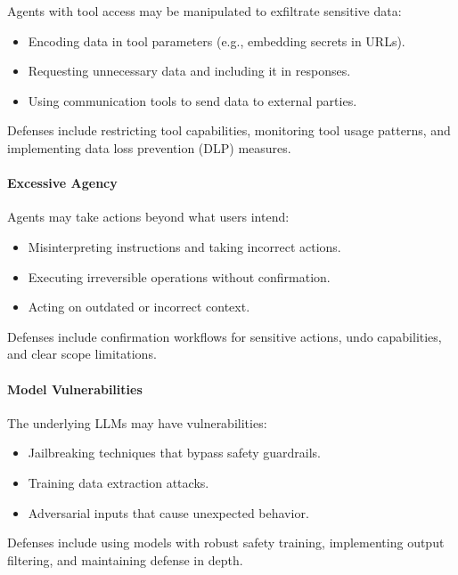 Agents with tool access may be manipulated to exfiltrate sensitive data:

\begin{itemize}
    \item Encoding data in tool parameters (e.g., embedding secrets in URLs).
    \item Requesting unnecessary data and including it in responses.
    \item Using communication tools to send data to external parties.
\end{itemize}

Defenses include restricting tool capabilities, monitoring tool usage patterns, and implementing data loss prevention (DLP) measures.

\paragraph{Excessive Agency}

Agents may take actions beyond what users intend:

\begin{itemize}
    \item Misinterpreting instructions and taking incorrect actions.
    \item Executing irreversible operations without confirmation.
    \item Acting on outdated or incorrect context.
\end{itemize}

Defenses include confirmation workflows for sensitive actions, undo capabilities, and clear scope limitations.

\paragraph{Model Vulnerabilities}

The underlying LLMs may have vulnerabilities:

\begin{itemize}
    \item Jailbreaking techniques that bypass safety guardrails.
    \item Training data extraction attacks.
    \item Adversarial inputs that cause unexpected behavior.
\end{itemize}

Defenses include using models with robust safety training, implementing output filtering, and maintaining defense in depth.

